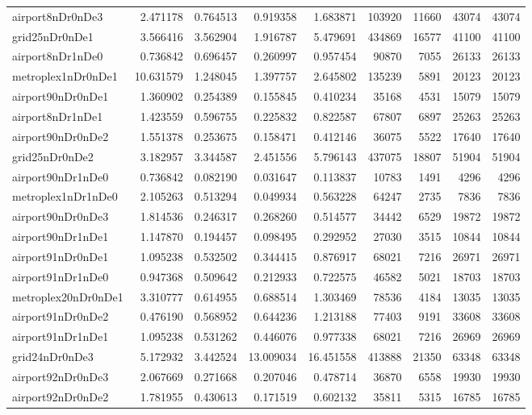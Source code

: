 \documentclass[../../../thesis.tex]{subfiles}
\begin{document}
\begin{longtable}{|l|r|r|r|r|r|r|r|r|}
airport8nDr0nDe3 & 2.471178 & 0.764513 & 0.919358 & 1.683871 & 103920 & 11660 & 43074 & 43074 \\
grid25nDr0nDe1 & 3.566416 & 3.562904 & 1.916787 & 5.479691 & 434869 & 16577 & 41100 & 41100 \\
airport8nDr1nDe0 & 0.736842 & 0.696457 & 0.260997 & 0.957454 & 90870 & 7055 & 26133 & 26133 \\
metroplex1nDr0nDe1 & 10.631579 & 1.248045 & 1.397757 & 2.645802 & 135239 & 5891 & 20123 & 20123 \\
airport90nDr0nDe1 & 1.360902 & 0.254389 & 0.155845 & 0.410234 & 35168 & 4531 & 15079 & 15079 \\
airport8nDr1nDe1 & 1.423559 & 0.596755 & 0.225832 & 0.822587 & 67807 & 6897 & 25263 & 25263 \\
airport90nDr0nDe2 & 1.551378 & 0.253675 & 0.158471 & 0.412146 & 36075 & 5522 & 17640 & 17640 \\
grid25nDr0nDe2 & 3.182957 & 3.344587 & 2.451556 & 5.796143 & 437075 & 18807 & 51904 & 51904 \\
airport90nDr1nDe0 & 0.736842 & 0.082190 & 0.031647 & 0.113837 & 10783 & 1491 & 4296 & 4296 \\
metroplex1nDr1nDe0 & 2.105263 & 0.513294 & 0.049934 & 0.563228 & 64247 & 2735 & 7836 & 7836 \\
airport90nDr0nDe3 & 1.814536 & 0.246317 & 0.268260 & 0.514577 & 34442 & 6529 & 19872 & 19872 \\
airport90nDr1nDe1 & 1.147870 & 0.194457 & 0.098495 & 0.292952 & 27030 & 3515 & 10844 & 10844 \\
airport91nDr0nDe1 & 1.095238 & 0.532502 & 0.344415 & 0.876917 & 68021 & 7216 & 26971 & 26971 \\
airport91nDr1nDe0 & 0.947368 & 0.509642 & 0.212933 & 0.722575 & 46582 & 5021 & 18703 & 18703 \\
metroplex20nDr0nDe1 & 3.310777 & 0.614955 & 0.688514 & 1.303469 & 78536 & 4184 & 13035 & 13035 \\
airport91nDr0nDe2 & 0.476190 & 0.568952 & 0.644236 & 1.213188 & 77403 & 9191 & 33608 & 33608 \\
airport91nDr1nDe1 & 1.095238 & 0.531262 & 0.446076 & 0.977338 & 68021 & 7216 & 26969 & 26969 \\
grid24nDr0nDe3 & 5.172932 & 3.442524 & 13.009034 & 16.451558 & 413888 & 21350 & 63348 & 63348 \\
airport92nDr0nDe3 & 2.067669 & 0.271668 & 0.207046 & 0.478714 & 36870 & 6558 & 19930 & 19930 \\
airport92nDr0nDe2 & 1.781955 & 0.430613 & 0.171519 & 0.602132 & 35811 & 5315 & 16785 & 16785 \\

\end{longtable}
\end{document}
